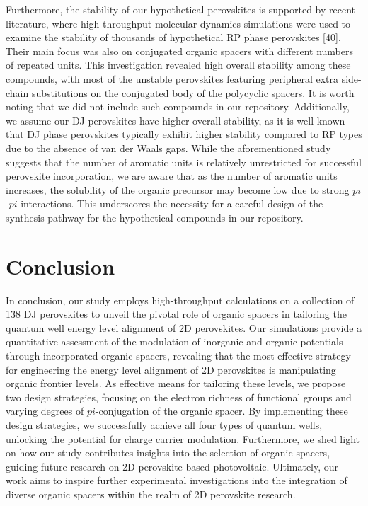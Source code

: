 Furthermore, the stability of our hypothetical perovskites is supported by recent literature, where high-throughput molecular dynamics simulations were used to examine the stability of thousands of hypothetical RP phase perovskites [40]. Their main focus was also on conjugated organic spacers with different numbers of repeated units. This investigation revealed high overall stability among these compounds, with most of the unstable perovskites featuring peripheral extra side-chain substitutions on the conjugated body of the polycyclic spacers. It is worth noting that we did not include such compounds in our repository. Additionally, we assume our DJ perovskites have higher overall stability, as it is well-known that DJ phase perovskites typically exhibit higher stability compared to RP types due to the absence of van der Waals gaps. While the aforementioned study suggests that the number of aromatic units is relatively unrestricted for successful perovskite incorporation, we are aware that as the number of aromatic units increases, the solubility of the organic precursor may become low due to strong $pi$-$pi$ interactions. This underscores the necessity for a careful design of the synthesis pathway for the hypothetical compounds in our repository.

\section{Conclusion}

In conclusion, our study employs high-throughput calculations on a collection of 138 DJ perovskites to unveil the pivotal role of organic spacers in tailoring the quantum well energy level alignment of 2D perovskites. Our simulations provide a quantitative assessment of the modulation of inorganic and organic potentials through incorporated organic spacers, revealing that the most effective strategy for engineering the energy level alignment of 2D perovskites is manipulating organic frontier levels. As effective means for tailoring these levels, we propose two design strategies, focusing on the electron richness of functional groups and varying degrees of $pi$-conjugation of the organic spacer. By implementing these design strategies, we successfully achieve all four types of quantum wells, unlocking the potential for charge carrier modulation. Furthermore, we shed light on how our study contributes insights into the selection of organic spacers, guiding future research on 2D perovskite-based photovoltaic. Ultimately, our work aims to inspire further experimental investigations into the integration of diverse organic spacers within the realm of 2D perovskite research.


